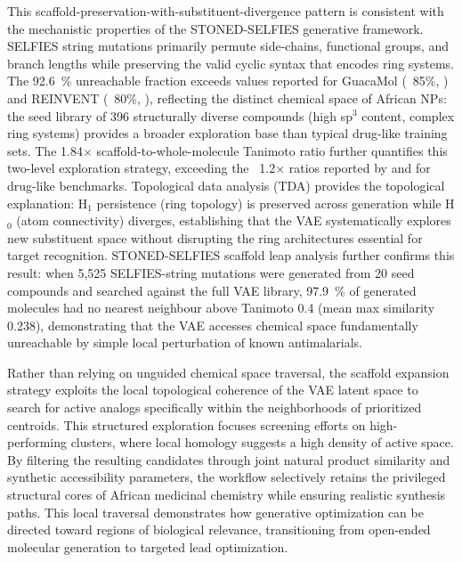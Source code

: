 \documentclass[journal=jcisd8,manuscript=article]{achemso}
\begin{document}
This scaffold-preservation-with-substituent-divergence pattern is consistent with the mechanistic properties of the STONED-SELFIES generative framework. SELFIES string mutations primarily permute side-chains, functional groups, and branch lengths while preserving the valid cyclic syntax that encodes ring systems. The \qty{92.6}{\percent} unreachable fraction exceeds values reported for GuacaMol (~85\%, \cite{Brown2019}) and REINVENT (~80\%, \cite{gomez2018automatic}), reflecting the distinct chemical space of African NPs: the seed library of \num{396} structurally diverse compounds (high sp$^3$ content, complex ring systems) provides a broader exploration base than typical drug-like training sets. The \num{1.84}$\times$ scaffold-to-whole-molecule Tanimoto ratio further quantifies this two-level exploration strategy, exceeding the ~\num{1.2}$\times$ ratios reported by \cite{Brown2019} and \cite{Blaschke2020REINVENT2A} for drug-like benchmarks. Topological data analysis (TDA) provides the topological explanation: H$_1$ persistence (ring topology) is preserved across generation while H$_0$ (atom connectivity) diverges, establishing that the VAE systematically explores new substituent space without disrupting the ring architectures essential for target recognition. STONED-SELFIES scaffold leap analysis further confirms this result: when 5,525 SELFIES-string mutations were generated from 20 seed compounds and searched against the full VAE library, \qty{97.9}{\percent} of generated molecules had no nearest neighbour above Tanimoto \num{0.4} (mean max similarity \num{0.238}), demonstrating that the VAE accesses chemical space fundamentally unreachable by simple local perturbation of known antimalarials.

Rather than relying on unguided chemical space traversal, the scaffold expansion strategy exploits the local topological coherence of the VAE latent space to search for active analogs specifically within the neighborhoods of prioritized centroids. This structured exploration focuses screening efforts on high-performing clusters, where local homology suggests a high density of active space. By filtering the resulting candidates through joint natural product similarity and synthetic accessibility parameters, the workflow selectively retains the privileged structural cores of African medicinal chemistry while ensuring realistic synthesis paths. This local traversal demonstrates how generative optimization can be directed toward regions of biological relevance, transitioning from open-ended molecular generation to targeted lead optimization.
\end{document}
